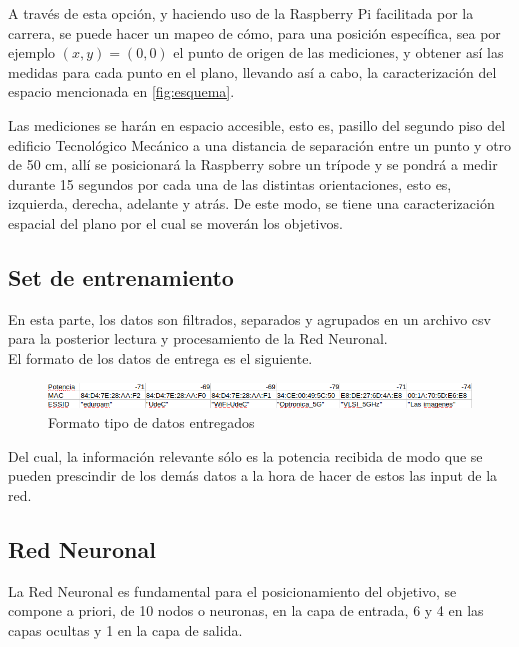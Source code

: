\begin{itemize}
    A través de esta opción, y haciendo uso de la Raspberry Pi facilitada por la carrera, se puede hacer un mapeo de cómo, para una posición específica, sea por ejemplo $(x,y) = (0,0)$ el punto de origen de las mediciones, y obtener así las medidas para cada punto en el plano, llevando así a cabo, la caracterización del espacio mencionada en \ref{fig:esquema}.
\end{itemize}

\newpage

Las mediciones se harán en espacio accesible, esto es, pasillo del segundo piso del edificio Tecnológico Mecánico a una distancia de separación entre un punto y otro de 50 cm, allí se posicionará la Raspberry sobre un trípode y se pondrá a medir durante 15 segundos por cada una de las distintas orientaciones, esto es, izquierda, derecha, adelante y atrás. De este modo, se tiene una caracterización espacial del plano por el cual se moverán los objetivos.\\


\subsection{Set de entrenamiento}
En esta parte, los datos son filtrados, separados y agrupados en un archivo csv para la posterior lectura y procesamiento de la Red Neuronal.\\

El formato de los datos de entrega es el siguiente.
\begin{figure}[h!]
    \centering
    \includegraphics[scale=0.5]{./images/datos}
    \caption{Formato tipo de datos entregados }
    \label{fig:datos}
\end{figure}

Del cual, la información relevante sólo es la potencia recibida de modo que se pueden prescindir de los demás datos a la hora de hacer de estos las input de la red.

\subsection{Red Neuronal}
La Red Neuronal es fundamental para el posicionamiento del objetivo, se compone a priori, de 10 nodos o neuronas, en la capa de entrada, 6 y 4 en las capas ocultas y 1 en la capa de salida.

